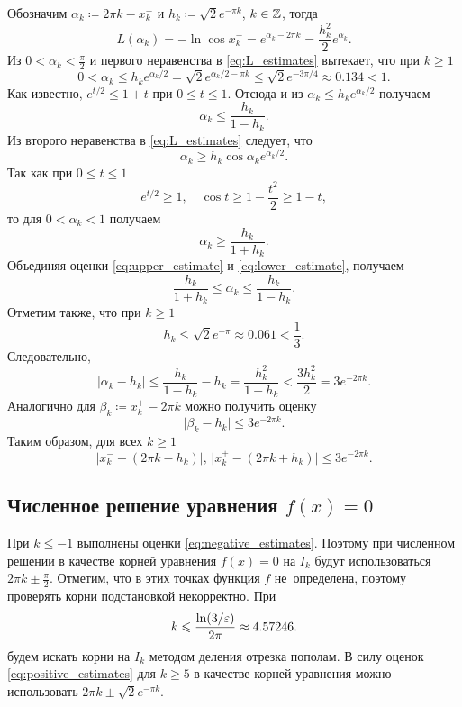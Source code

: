 \documentclass[a5paper, leqno, 10pt]{article}
\begin{document}
Обозначим $\alpha_k \coloneqq 2\pi k - x_k^{-}$ и $h_k \coloneq \sqrt{2}e^{-\pi k}$, $k \in \mathbb{Z}$, тогда
\[
	L(\alpha_k) = -\ln\cos x_k^{-} = e^{\alpha_k - 2\pi k} = \frac{h_k^2}{2}e^{\alpha_k}.
\]
Из $0 < \alpha_k < \frac{\pi}{2}$ и первого неравенства в \eqref{eq:L_estimates} вытекает, что при $k \geqslant 1$
\[
	0 < \alpha_k \leqslant h_ke^{\alpha_k / 2} = \sqrt{2}e^{\alpha_k / 2 -\pi k} \leqslant \sqrt{2}e^{-3\pi / 4} \approx 0{.}134 < 1.
\]
Как известно, $e^{t / 2} \leqslant 1 + t$ при $0 \leqslant t \leqslant 1$. Отсюда и из $\alpha_k \leqslant h_ke^{\alpha_k / 2}$ получаем
\begin{equation} \label{eq:upper_estimate}
	\alpha_k \leqslant \frac{h_k}{1 - h_k}.
\end{equation}
Из второго неравенства в \eqref{eq:L_estimates} следует, что
\[
	\alpha_k \geqslant h_k\cos\alpha_ke^{\alpha_k / 2}.
\]
Так как при $0 \leqslant t \leqslant 1$
\[
	e^{t / 2} \geqslant 1,\quad \cos t \geqslant 1 - \frac{t^2}{2} \geqslant 1 - t,
\]
то для $0 < \alpha_k < 1$ получаем
\begin{equation} \label{eq:lower_estimate}
	\alpha_k \geqslant \frac{h_k}{1 + h_k}.
\end{equation}
Объединяя оценки \eqref{eq:upper_estimate} и \eqref{eq:lower_estimate}, получаем
\[
	\frac{h_k}{1 + h_k} \leqslant \alpha_k \leqslant \frac{h_k}{1 - h_k}.
\]
Отметим также, что при $k \geqslant 1$
\[
	h_k \leqslant \sqrt{2}e^{-\pi} \approx 0{.}061 < \frac{1}{3}.
\]
Следовательно,
\[
	\lvert\alpha_k - h_k\rvert \leqslant \frac{h_k}{1 - h_k} - h_k = \frac{h_k^2}{1 - h_k} < \frac{3h_k^2}{2} = 3e^{-2\pi k}.
\]
Аналогично для $\beta_k \coloneqq x_k^{+} - 2\pi k$ можно получить оценку
\[
	\lvert\beta_k - h_k\rvert \leqslant 3e^{-2\pi k}.
\]
Таким образом, для всех $k \geqslant 1$
\begin{equation} \label{eq:positive_estimates}
	\lvert x_k^{-} - (2\pi k - h_k)\rvert,\,\lvert x_k^{+} - (2\pi k + h_k)\rvert \leqslant 3e^{-2\pi k}.
\end{equation}

\subsection{Численное решение уравнения $f(x) = 0$}

При $k \leqslant -1$ выполнены оценки \eqref{eq:negative_estimates}. Поэтому при численном решении в качестве корней уравнения $f(x) = 0$ на $I_k$ будут использоваться $2\pi k \pm \frac{\pi}{2}$. Отметим, что в этих точках функция $f$ не~определена, поэтому проверять корни подстановкой некорректно. При
\[
	k \leqslant \frac{\ln(3 / \varepsilon)}{2\pi} \approx 4{.}57246.
\]
будем искать корни на $I_k$ методом деления отрезка пополам. В силу оценок \eqref{eq:positive_estimates} для $k \geqslant 5$ в качестве корней уравнения можно использовать $2\pi k \pm \sqrt{2}e^{-\pi k}$.
\end{document}
